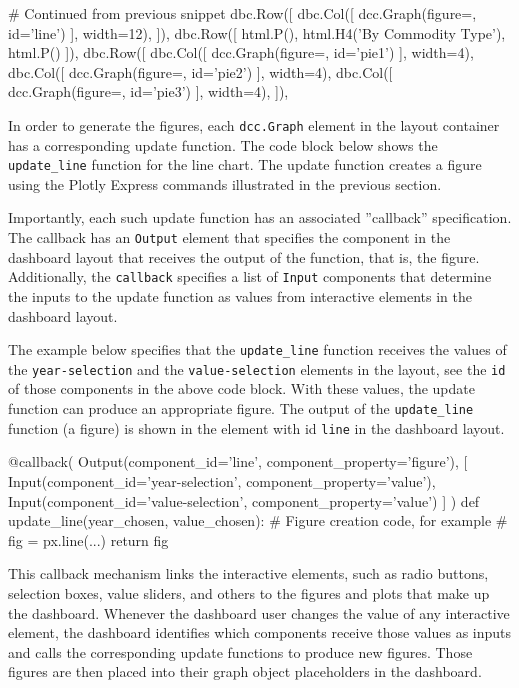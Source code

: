 \begin{pythoncode}
# Continued from previous snippet
   dbc.Row([
        dbc.Col([
            dcc.Graph(figure={}, id='line')
        ], width=12),
    ]),
    dbc.Row([
        html.P(),
        html.H4('By Commodity Type'),
        html.P()
    ]),
    dbc.Row([
        dbc.Col([
            dcc.Graph(figure={}, id='pie1')
        ], width=4),
        dbc.Col([
            dcc.Graph(figure={}, id='pie2')
        ], width=4),
        dbc.Col([
            dcc.Graph(figure={}, id='pie3')
        ], width=4),
    ]),
\end{pythoncode}

In order to generate the figures, each \texttt{dcc.Graph} element in the layout container has a corresponding update function. The code block below shows the \texttt{update\_line} function for the line chart. The update function creates a figure using the Plotly Express commands illustrated in the previous section.

Importantly, each such update function has an associated ''callback'' specification. The callback has an \texttt{Output} element that specifies the component in the dashboard layout that receives the output of the function, that is, the figure. Additionally, the \texttt{callback} specifies a list of \texttt{Input} components that determine the inputs to the update function as values from interactive elements in the dashboard layout. 

The example below specifies that the \texttt{update\_line} function receives the values of the \texttt{year-selection} and the \texttt{value-selection} elements in the layout, see the \texttt{id} of those components in the above code block. With these values, the update function can produce an appropriate figure. The output of the \texttt{update\_line} function (a figure) is shown in the element with id \texttt{line} in the dashboard layout. 

\begin{pythoncode}
@callback(
    Output(component_id='line', component_property='figure'),
    [
        Input(component_id='year-selection', 
              component_property='value'),
        Input(component_id='value-selection', 
              component_property='value')
    ]
)
def update_line(year_chosen, value_chosen): 
    # Figure creation code, for example
    # fig = px.line(...)
    return fig
\end{pythoncode}

This callback mechanism links the interactive elements, such as radio buttons, selection boxes, value sliders, and others to the figures and plots that make up the dashboard. Whenever the dashboard user changes the value of any interactive element, the dashboard identifies which components receive those values as inputs and calls the corresponding update functions to produce new figures. Those figures are then placed into their graph object placeholders in the dashboard. 

